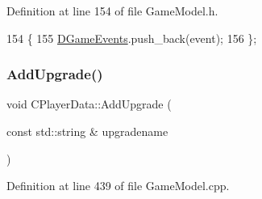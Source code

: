Definition at line 154 of file Game\+Model.\+h.


\begin{DoxyCode}
154                                                   \{
155             \hyperlink{classCPlayerData_a9a7af43e88055d6d1a384a8817a655a0}{DGameEvents}.push\_back(event);  
156         \};
\end{DoxyCode}
\hypertarget{classCPlayerData_ae66fe7d594267990adf34f9286925efb}{}\label{classCPlayerData_ae66fe7d594267990adf34f9286925efb} 
\subsubsection{\texorpdfstring{Add\+Upgrade()}{AddUpgrade()}}
{\footnotesize\ttfamily void C\+Player\+Data\+::\+Add\+Upgrade (\begin{DoxyParamCaption}\item[{const std\+::string \&}]{upgradename }\end{DoxyParamCaption})}



Definition at line 439 of file Game\+Model.\+cpp.


